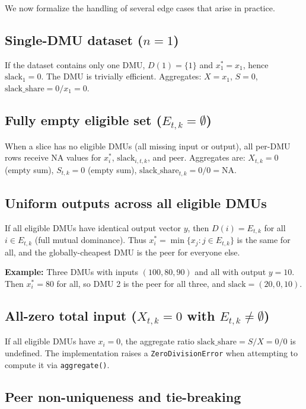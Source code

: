 \documentclass[11pt]{article}
\theoremstyle{definition}
\theoremstyle{plain}
\theoremstyle{remark}
\begin{document}
We now formalize the handling of several edge cases that arise in practice.

\subsection*{Single-DMU dataset ($n=1$)}

If the dataset contains only one DMU, $D(1) = \{1\}$ and $x_1^* = x_1$, hence $\text{slack}_1 = 0$. The DMU is trivially efficient. Aggregates: $X = x_1$, $S = 0$, $\text{slack\_share} = 0 / x_1 = 0$.

\subsection*{Fully empty eligible set ($E_{t,k} = \emptyset$)}

When a slice has no eligible DMUs (all missing input or output), all per-DMU rows receive NA values for $x_i^*$, $\text{slack}_{i,t,k}$, and $\text{peer}$.
Aggregates are: $X_{t,k} = 0$ (empty sum), $S_{t,k} = 0$ (empty sum), $\text{slack\_share}_{t,k} = 0/0 = \text{NA}$.

\subsection*{Uniform outputs across all eligible DMUs}

If all eligible DMUs have identical output vector $y$, then $D(i) = E_{t,k}$ for all $i \in E_{t,k}$ (full mutual dominance).
Thus $x_i^* = \min\{x_j : j \in E_{t,k}\}$ is the same for all, and the globally-cheapest DMU is the peer for everyone else.

\textbf{Example:} Three DMUs with inputs $(100, 80, 90)$ and all with output $y = 10$.
Then $x_i^* = 80$ for all, so DMU 2 is the peer for all three, and $\text{slack} = (20, 0, 10)$.

\subsection*{All-zero total input ($X_{t,k} = 0$ with $E_{t,k} \ne \emptyset$)}

If all eligible DMUs have $x_i = 0$, the aggregate ratio $\text{slack\_share} = S / X = 0 / 0$ is undefined.
The implementation raises a \texttt{ZeroDivisionError} when attempting to compute it via \texttt{aggregate()}.

\subsection*{Peer non-uniqueness and tie-breaking}
\end{document}
